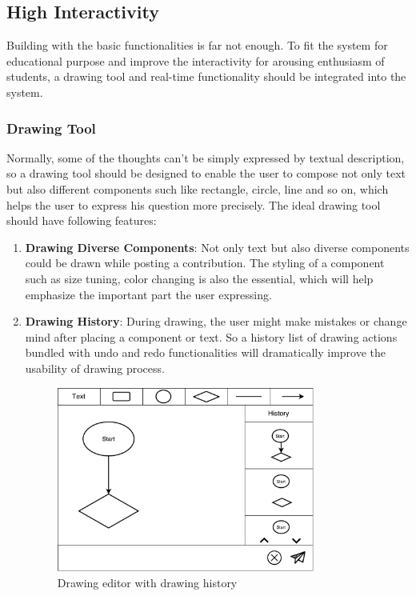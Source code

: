 \subsection{High Interactivity}
Building with the basic functionalities is far not enough. To fit the system for educational purpose and improve the interactivity for arousing enthusiasm of students, a drawing tool and real-time functionality should be integrated into the system.

\subsubsection{Drawing Tool}
Normally, some of the thoughts can't be simply expressed by textual description, so a drawing tool should be designed to enable the user to compose not only text but also different components such like rectangle, circle, line and so on, which helps the user to express his question more precisely.
The ideal drawing tool should have following features:

\begin{enumerate}
\item
\textbf{Drawing Diverse Components}: Not only text but also diverse components could be drawn while posting a contribution. The styling of a component such as size tuning, color changing is also the essential, which will help emphasize the important part the user expressing.

\item
\textbf{Drawing History}: During drawing, the user might make mistakes or change mind after placing a component or text. So a history list of drawing actions bundled with undo and redo functionalities will dramatically improve the usability of drawing process.

\begin{figure}[!htbp]
  \centering
    \includegraphics[width=0.8\textwidth]{Figures/mockup/editor.pdf}
  \caption{Drawing editor with drawing history}
\end{figure}


\end{enumerate}


